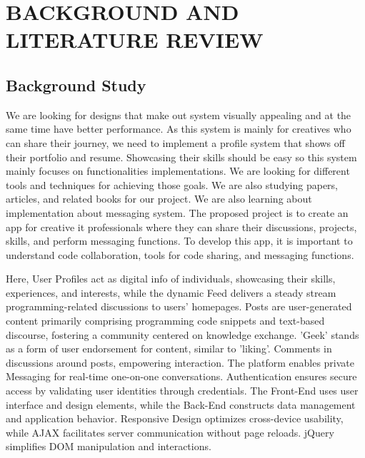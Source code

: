 \chapter{BACKGROUND AND LITERATURE REVIEW}





\section{Background Study}

We are looking for designs that make out system visually appealing and at the same time have better performance. As this system is mainly for creatives who can share their journey, we need to implement a profile system that shows off their portfolio and resume. Showcasing their skills should be easy so this system mainly focuses on functionalities implementations. We are looking for different tools and techniques for achieving those goals. We are also studying papers, articles, and related books for our project. We are also learning about implementation about messaging system.
The proposed project is to create an app for creative it professionals where they can share their discussions, projects, skills, and perform messaging functions. To develop this app, it is important to understand code collaboration, tools for code sharing, and messaging functions.

Here, User Profiles act as digital info of individuals, showcasing their skills, experiences, and interests, while the dynamic Feed delivers a steady stream programming-related discussions to users' homepages. Posts are user-generated content primarily comprising programming code snippets and text-based discourse, fostering a community centered on knowledge exchange. 'Geek' stands as a form of user endorsement for content, similar to 'liking'. Comments in discussions around posts, empowering interaction. The platform enables private Messaging for real-time one-on-one conversations. Authentication ensures secure access by validating user identities through credentials. The Front-End uses user interface and design elements, while the Back-End constructs data management and application behavior. Responsive Design optimizes cross-device usability, while AJAX facilitates server communication without page reloads. jQuery simplifies DOM manipulation and interactions.

